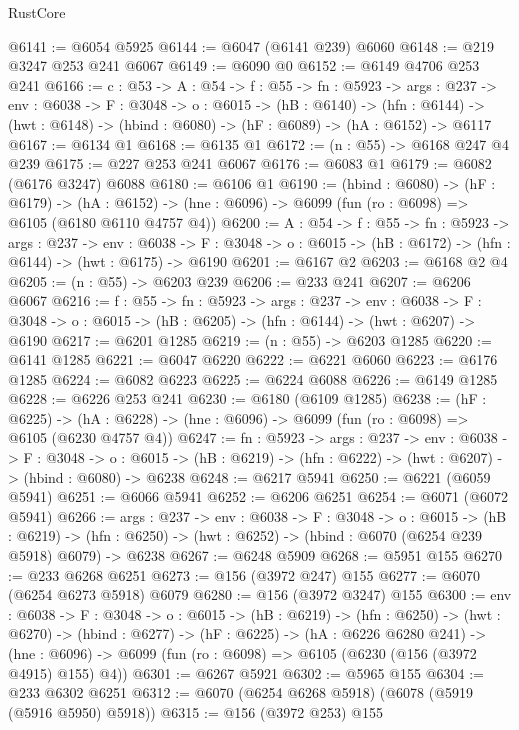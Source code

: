 \begin{lexlean}{RustCore}
\begin{coremodule}
@6141 := @6054 @5925
@6144 := @6047 (@6141 @239) @6060
@6148 := @219 @3247 @253 @241 @6067
@6149 := @6090 @0
@6152 := @6149 @4706 @253 @241
@6166 := {c : @53} ->
  {A : @54} ->
  {f : @55} ->
  {fn : @5923} ->
  {args : @237} ->
  {env : @6038} ->
  {F : @3048} ->
  {o : @6015} ->
  (hB : @6140) ->
  (hfn : @6144) -> (hwt : @6148) -> (hbind : @6080) -> (hF : @6089) -> (hA : @6152) -> @6117
@6167 := @6134 @1
@6168 := @6135 @1
@6172 := (n : @55) -> @6168 @247 @4 @239
@6175 := @227 @253 @241 @6067
@6176 := @6083 @1
@6179 := @6082 (@6176 @3247) @6088
@6180 := @6106 @1
@6190 := (hbind : @6080) ->
  (hF : @6179) ->
  (hA : @6152) -> (hne : @6096) -> @6099 (fun (ro : @6098) => @6105 (@6180 @6110 @4757 @4))
@6200 := {A : @54} ->
  {f : @55} ->
  {fn : @5923} ->
  {args : @237} ->
  {env : @6038} ->
  {F : @3048} -> {o : @6015} -> (hB : @6172) -> (hfn : @6144) -> (hwt : @6175) -> @6190
@6201 := @6167 @2
@6203 := @6168 @2 @4
@6205 := (n : @55) -> @6203 @239
@6206 := @233 @241
@6207 := @6206 @6067
@6216 := {f : @55} ->
  {fn : @5923} ->
  {args : @237} ->
  {env : @6038} ->
  {F : @3048} -> {o : @6015} -> (hB : @6205) -> (hfn : @6144) -> (hwt : @6207) -> @6190
@6217 := @6201 @1285
@6219 := (n : @55) -> @6203 @1285
@6220 := @6141 @1285
@6221 := @6047 @6220
@6222 := @6221 @6060
@6223 := @6176 @1285
@6224 := @6082 @6223
@6225 := @6224 @6088
@6226 := @6149 @1285
@6228 := @6226 @253 @241
@6230 := @6180 (@6109 @1285)
@6238 := (hF : @6225) ->
  (hA : @6228) -> (hne : @6096) -> @6099 (fun (ro : @6098) => @6105 (@6230 @4757 @4))
@6247 := {fn : @5923} ->
  {args : @237} ->
  {env : @6038} ->
  {F : @3048} ->
  {o : @6015} -> (hB : @6219) -> (hfn : @6222) -> (hwt : @6207) -> (hbind : @6080) -> @6238
@6248 := @6217 @5941
@6250 := @6221 (@6059 @5941)
@6251 := @6066 @5941
@6252 := @6206 @6251
@6254 := @6071 (@6072 @5941)
@6266 := {args : @237} ->
  {env : @6038} ->
  {F : @3048} ->
  {o : @6015} ->
  (hB : @6219) ->
  (hfn : @6250) -> (hwt : @6252) -> (hbind : @6070 (@6254 @239 @5918) @6079) -> @6238
@6267 := @6248 @5909
@6268 := @5951 @155
@6270 := @233 @6268 @6251
@6273 := @156 (@3972 @247) @155
@6277 := @6070 (@6254 @6273 @5918) @6079
@6280 := @156 (@3972 @3247) @155
@6300 := {env : @6038} ->
  {F : @3048} ->
  {o : @6015} ->
  (hB : @6219) ->
  (hfn : @6250) ->
  (hwt : @6270) ->
  (hbind : @6277) ->
  (hF : @6225) ->
  (hA : @6226 @6280 @241) ->
  (hne : @6096) -> @6099 (fun (ro : @6098) => @6105 (@6230 (@156 (@3972 @4915) @155) @4))
@6301 := @6267 @5921
@6302 := @5965 @155
@6304 := @233 @6302 @6251
@6312 := @6070 (@6254 @6268 @5918) (@6078 (@5919 (@5916 @5950) @5918))
@6315 := @156 (@3972 @253) @155

\end{coremodule}
\end{lexlean}
